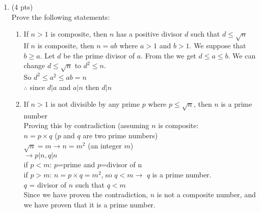 \documentclass[12pt]{article}
\begin{document}
\begin{enumerate}
\item (4 pts) \\
Prove the following statements:
\begin{enumerate}
	\item  If \(n>1\) is composite, then \(n\) has a positive divisor \(d\) such that \(d \leq \sqrt{n}\)
    \\If $n$ is composite, then $n=ab$ where $a > 1$ and $b>1$. We suppose that $b \geq a$. Let $d$ be the prime divisor of $a$. From the we get $d \leq a \leq b$. We can change $d \leq \sqrt{n}$ to $d^2 \leq n$.
    \\So $d^2 \leq a^2 \leq ab = n$
    \\$\therefore$ since $d|a$ and $a|n$ then $d|n$
	\item  If \(n>1\) is not divisible by any prime \(p\) where \(p \leq \sqrt{n}\), then \(n\) is a prime number
    \\Proving this by contradiction (assuming $n$ is composite:
    \\$n = p \times q$ ($p$ and $q$ are two prime numbers)
    \\$\sqrt{n} = m \rightarrow n = m^2$ (an integer $m$)
    \\$\rightarrow p|n, q|n$
    \\if $p < m$: $p$=prime and $p$=divisor of n
    \\if $p>m$: $n = p \times q = m^2$, so $q < m \rightarrow$ $q$ is a prime number. 
    \\$q$ = divisor of $n$ such that $q<m$
    \\Since we have proven the contradiction, $n$ is not a composite number, and we have proven that it is a prime number.
\end{enumerate}


\end{enumerate}
\end{document}
